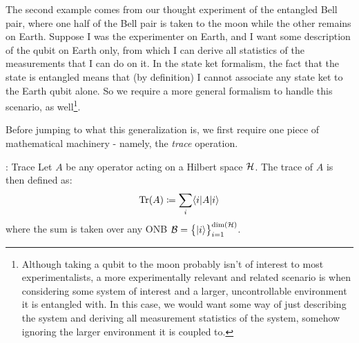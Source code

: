 The second example comes from our thought experiment of the entangled Bell pair, where one half of the Bell pair is taken to the moon while the other remains on Earth. Suppose I was the experimenter on Earth, and I want some description of the qubit on Earth only, from which I can derive all statistics of the measurements that I can do on it. In the state ket formalism, the fact that the state is entangled means that (by definition) I cannot associate any state ket to the Earth qubit alone. So we require a more general formalism to handle this scenario, as well\footnote{Although taking a qubit to the moon probably isn't of interest to most experimentalists, a more experimentally relevant and related scenario is when considering some system of interest and a larger, uncontrollable environment it is entangled with. In this case, we would want some way of just describing the system and deriving all measurement statistics of the system, somehow ignoring the larger environment it is coupled to.}.

Before jumping to what this generalization is, we first require one piece of mathematical machinery - namely, the \emph{trace} operation.

\begin{defbox}{: Trace}
    Let $A$ be any operator acting on a Hilbert space $\mathcal{H}$. The trace of $A$ is then defined as:
    \begin{equation}
        \mathrm{Tr}(A) \coloneqq \sum_i \langle i \rvert A\lvert i \rangle
    \end{equation} 
    where the sum is taken over any ONB $\mathcal{B} = \set{\lvert i \rangle}_{i=1}^{\dim(\mathcal{H})}$. 
\end{defbox}

